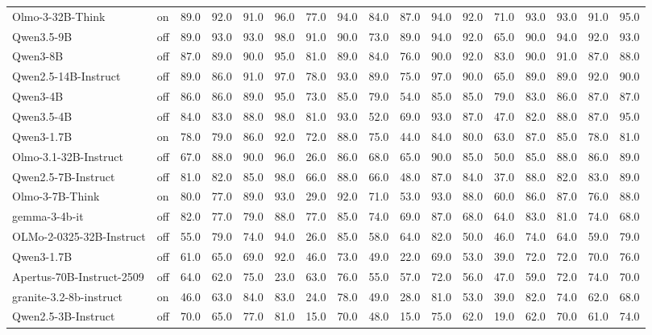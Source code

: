 \begin{table}
{\begin{tabular}{llrrrrrrrrrrrrrrr}
Olmo-3-32B-Think & on & 89.0 & 92.0 & 91.0 & 96.0 & 77.0 & 94.0 & 84.0 & 87.0 & 94.0 & 92.0 & 71.0 & 93.0 & 93.0 & 91.0 & 95.0 \\
Qwen3.5-9B & off & 89.0 & 93.0 & 93.0 & 98.0 & 91.0 & 90.0 & 73.0 & 89.0 & 94.0 & 92.0 & 65.0 & 90.0 & 94.0 & 92.0 & 93.0 \\
Qwen3-8B & off & 87.0 & 89.0 & 90.0 & 95.0 & 81.0 & 89.0 & 84.0 & 76.0 & 90.0 & 92.0 & 83.0 & 90.0 & 91.0 & 87.0 & 88.0 \\
Qwen2.5-14B-Instruct & off & 89.0 & 86.0 & 91.0 & 97.0 & 78.0 & 93.0 & 89.0 & 75.0 & 97.0 & 90.0 & 65.0 & 89.0 & 89.0 & 92.0 & 90.0 \\
Qwen3-4B & off & 86.0 & 86.0 & 89.0 & 95.0 & 73.0 & 85.0 & 79.0 & 54.0 & 85.0 & 85.0 & 79.0 & 83.0 & 86.0 & 87.0 & 87.0 \\
Qwen3.5-4B & off & 84.0 & 83.0 & 88.0 & 98.0 & 81.0 & 93.0 & 52.0 & 69.0 & 93.0 & 87.0 & 47.0 & 82.0 & 88.0 & 87.0 & 95.0 \\
Qwen3-1.7B & on & 78.0 & 79.0 & 86.0 & 92.0 & 72.0 & 88.0 & 75.0 & 44.0 & 84.0 & 80.0 & 63.0 & 87.0 & 85.0 & 78.0 & 81.0 \\
Olmo-3.1-32B-Instruct & off & 67.0 & 88.0 & 90.0 & 96.0 & 26.0 & 86.0 & 68.0 & 65.0 & 90.0 & 85.0 & 50.0 & 85.0 & 88.0 & 86.0 & 89.0 \\
Qwen2.5-7B-Instruct & off & 81.0 & 82.0 & 85.0 & 98.0 & 66.0 & 88.0 & 66.0 & 48.0 & 87.0 & 84.0 & 37.0 & 88.0 & 82.0 & 83.0 & 89.0 \\
Olmo-3-7B-Think & on & 80.0 & 77.0 & 89.0 & 93.0 & 29.0 & 92.0 & 71.0 & 53.0 & 93.0 & 88.0 & 60.0 & 86.0 & 87.0 & 76.0 & 88.0 \\
gemma-3-4b-it & off & 82.0 & 77.0 & 79.0 & 88.0 & 77.0 & 85.0 & 74.0 & 69.0 & 87.0 & 68.0 & 64.0 & 83.0 & 81.0 & 74.0 & 68.0 \\
OLMo-2-0325-32B-Instruct & off & 55.0 & 79.0 & 74.0 & 94.0 & 26.0 & 85.0 & 58.0 & 64.0 & 82.0 & 50.0 & 46.0 & 74.0 & 64.0 & 59.0 & 79.0 \\
Qwen3-1.7B & off & 61.0 & 65.0 & 69.0 & 92.0 & 46.0 & 73.0 & 49.0 & 22.0 & 69.0 & 53.0 & 39.0 & 72.0 & 72.0 & 70.0 & 76.0 \\
Apertus-70B-Instruct-2509 & off & 64.0 & 62.0 & 75.0 & 23.0 & 63.0 & 76.0 & 55.0 & 57.0 & 72.0 & 56.0 & 47.0 & 59.0 & 72.0 & 74.0 & 70.0 \\
granite-3.2-8b-instruct & on & 46.0 & 63.0 & 84.0 & 83.0 & 24.0 & 78.0 & 49.0 & 28.0 & 81.0 & 53.0 & 39.0 & 82.0 & 74.0 & 62.0 & 68.0 \\
Qwen2.5-3B-Instruct & off & 70.0 & 65.0 & 77.0 & 81.0 & 15.0 & 70.0 & 48.0 & 15.0 & 75.0 & 62.0 & 19.0 & 62.0 & 70.0 & 61.0 & 74.0 \\

\end{tabular}}
\end{table}
